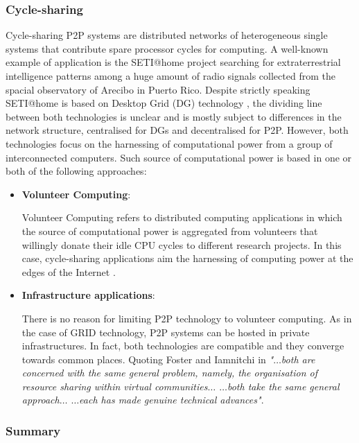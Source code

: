 \subsubsection{Cycle-sharing}

    Cycle-sharing P2P systems are distributed networks of heterogeneous single systems that contribute spare processor cycles for computing. A well-known example of application is the SETI@home project \cite{seti} searching for extraterrestrial intelligence patterns among a huge amount of radio signals collected from the spacial observatory of Arecibo in Puerto Rico. Despite strictly speaking SETI@home is based on Desktop Grid (DG) technology \cite{boinc}, the dividing line between both technologies is unclear and is mostly subject to differences in the network structure, centralised for DGs and decentralised for P2P. However, both technologies focus on the harnessing of computational power from a group of interconnected computers. Such source of computational power is  based in one or both of the following approaches:


\begin{itemize}
\item {\bf Volunteer Computing}:

    Volunteer Computing refers to distributed computing applications in which the source of computational power is aggregated from volunteers that willingly donate their idle CPU cycles to different research projects. In this case, cycle-sharing applications aim the harnessing of computing power at the edges of the Internet \cite{wehrle05:p2p}. 


\item {\bf Infrastructure applications}:

    There is no reason for limiting P2P technology to volunteer computing. As in the case of GRID technology, P2P systems can be hosted in private infrastructures. In fact, both technologies are compatible and they converge towards common places. Quoting Foster and Iamnitchi in \cite{deathtaxes} \emph{"$\dots$both are concerned with the same general problem, namely, the organisation of resource sharing within virtual communities$\dots$ $\dots$both take the same general approach$\dots$ $\dots$each has made genuine technical advances"}.
\end{itemize}

\subsubsection{Summary}

